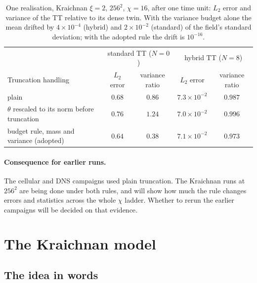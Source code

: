 \documentclass[aps,prfluids,reprint,onecolumn,amsmath,amssymb,nofootinbib,floatfix]{revtex4-2}
\begin{document}
\begin{table}[h]
\caption{One realisation, Kraichnan $\xi=2$, $256^2$, $\chi=16$, after one time
unit: $L_2$ error and variance of the TT relative to its dense twin. With the
variance budget alone the mean drifted by $4\times10^{-4}$ (hybrid) and
$2\times10^{-2}$ (standard) of the field's standard deviation; with the adopted
rule the drift is $10^{-16}$.}
\label{tab:policies}
\begin{ruledtabular}
\begin{tabular}{lcccc}
 & \multicolumn{2}{c}{standard TT ($N=0$)} & \multicolumn{2}{c}{hybrid TT ($N=8$)}\\
Truncation handling & $L_2$ error & variance ratio & $L_2$ error & variance ratio\\
\hline
plain & $0.68$ & $0.86$ & $7.3\times10^{-2}$ & $0.987$\\
$\theta$ rescaled to its norm before truncation & $0.76$ & $1.24$ & $7.0\times10^{-2}$ & $0.996$\\
budget rule, mass and variance (adopted) & $0.64$ & $0.38$ & $7.1\times10^{-2}$ & $0.973$\\
\end{tabular}
\end{ruledtabular}
\end{table}

\paragraph{Consequence for earlier runs.} The cellular and DNS campaigns used
plain truncation. The Kraichnan runs at $256^2$ are being done under both rules,
and will show how much the rule changes errors and statistics across the whole
$\chi$ ladder. Whether to rerun the earlier campaigns will be decided on that
evidence.

\section{The Kraichnan model}
\label{sec:kraichnan}

\subsection{The idea in words}
\end{document}
